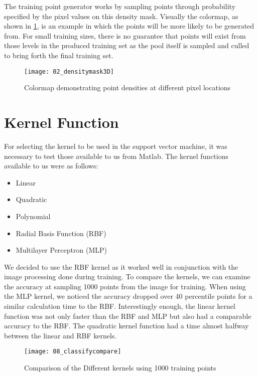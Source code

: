 The training point generator works by sampling points through probability specified by the pixel values on this density mask. Visually the colormap, as shown in \ref{fig:02_densitymask3D}, is an example in which the points will be more likely to be generated from. For small training sizes, there is no guarantee that points will exist from those levels in the produced training set as the pool itself is sampled and culled to bring forth the final training set.

\begin{figure}[ht]
    \centering
    \texttt{[image: 02\_densitymask3D]}
    \caption{Colormap demonstrating point densities at different pixel locations}
    \label{fig:02_densitymask3D}
\end{figure}


\section{Kernel Function}

For selecting the kernel to be used in the support vector machine, it was necessary to test those available to us from Matlab. The kernel functions available to us were as follows:

\begin{itemize}
  \item Linear
  \item Quadratic
  \item Polynomial
  \item Radial Basis Function (RBF)
  \item Multilayer Perceptron (MLP)
\end{itemize}

We decided to use the RBF kernel as it worked well in conjunction with the image processing done during training. To compare the kernels, we can examine the accuracy at sampling 1000 points from the image for training. When using the MLP kernel, we noticed the accuracy dropped over 40 percentile points for a similar calculation time to the RBF. Interestingly enough, the linear kernel function was not only faster than the RBF and MLP but also had a comparable accuracy to the RBF. The
quadratic kernel function had a time almost halfway between the linear and RBF kernels.

\begin{figure}[ht]
    \centering
    \texttt{[image: 08\_classifycompare]}
    \caption{Comparison of the Different kernels using 1000 training points}
    \label{fig:08_classifycompare}
\end{figure}


